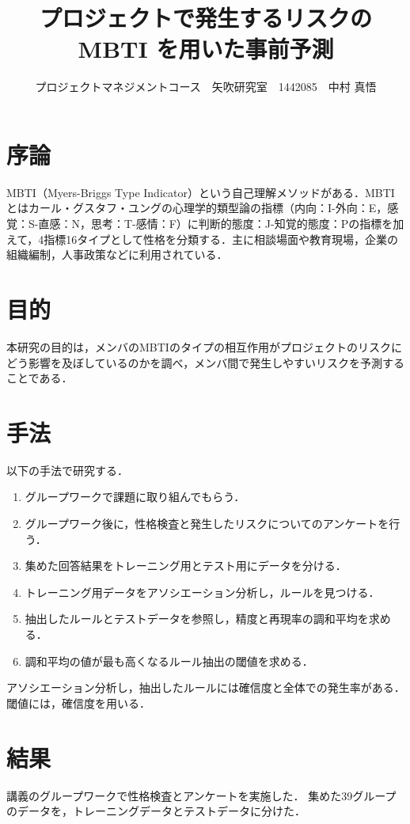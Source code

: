 \documentclass[uplatex,twocolumn,dvipdfmx]{jsarticle}
\title{\vspace{-5mm}\fontsize{14pt}{0pt}\selectfont プロジェクトで発生するリスクのMBTI を用いた事前予測}
\author{\normalsize プロジェクトマネジメントコース　矢吹研究室　1442085　中村 真悟}
\date{}
\begin{document}
\fontsize{10.5pt}{\baselineskip}\selectfont
\maketitle





\section{序論}\label{序論}
MBTI（Myers-Briggs Type Indicator）という自己理解メソッドがある．MBTIとはカール・グスタフ・ユングの心理学的類型論の指標（内向：I-外向：E，感覚：S-直感：N，思考：T-感情：F）に判断的態度：J-知覚的態度：Pの指標を加えて，4指標16タイプとして性格を分類する．主に相談場面や教育現場，企業の組織編制，人事政策などに利用されている\cite{110001230195}．

\section{目的}

本研究の目的は，メンバのMBTIのタイプの相互作用がプロジェクトのリスクにどう影響を及ぼしているのかを調べ，メンバ間で発生しやすいリスクを予測することである．
\section{手法}

以下の手法で研究する．
\begin{enumerate}
\item グループワークで課題に取り組んでもらう．
\item グループワーク後に，性格検査と発生したリスクについてのアンケートを行う．
\item 集めた回答結果をトレーニング用とテスト用にデータを分ける．
\item トレーニング用データをアソシエーション分析し，ルールを見つける．
\item 抽出したルールとテストデータを参照し，精度と再現率の調和平均を求める．
\item 調和平均の値が最も高くなるルール抽出の閾値を求める．
\end{enumerate}

アソシエーション分析し，抽出したルールには確信度と全体での発生率がある．閾値には，確信度を用いる．
\section{結果}
講義のグループワークで性格検査とアンケートを実施した．
集めた39グループのデータを，トレーニングデータとテストデータに分けた．
\end{document}
